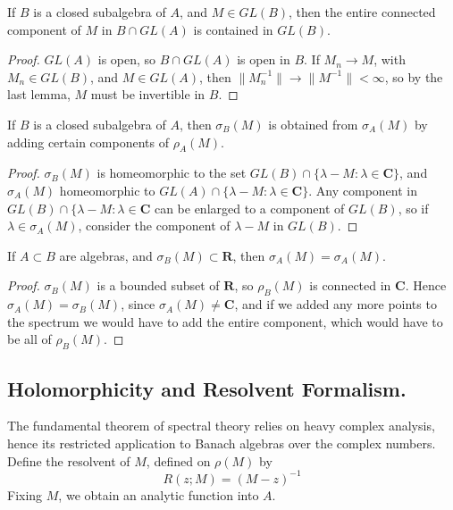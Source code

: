 \begin{theorem}
    If $B$ is a closed subalgebra of $A$, and $M \in GL(B)$, then the entire connected component of $M$ in $B \cap GL(A)$ is contained in $GL(B)$.
\end{theorem}
\begin{proof}
    $GL(A)$ is open, so $B \cap GL(A)$ is open in $B$. If $M_n \to M$, with $M_n \in GL(B)$, and $M \in GL(A)$, then $\| M_n^{-1} \| \to \| M^{-1} \| < \infty$, so by the last lemma, $M$ must be invertible in $B$.
\end{proof}

\begin{corollary}
    If $B$ is a closed subalgebra of $A$, then $\sigma_B(M)$ is obtained from $\sigma_A(M)$ by adding certain components of $\rho_A(M)$.
\end{corollary}
\begin{proof}
    $\sigma_B(M)$ is homeomorphic to the set $GL(B) \cap \{ \lambda - M : \lambda \in \mathbf{C} \}$, and $\sigma_A(M)$ homeomorphic to $GL(A) \cap \{ \lambda - M : \lambda \in \mathbf{C} \}$. Any component in $GL(B) \cap \{ \lambda - M : \lambda \in \mathbf{C}$ can be enlarged to a component of $GL(B)$, so if $\lambda \in \sigma_A(M)$, consider the component of $\lambda - M$ in $GL(B)$.
\end{proof}

\begin{corollary}
    If $A \subset B$ are algebras, and $\sigma_B(M) \subset \mathbf{R}$, then $\sigma_A(M) = \sigma_A(M)$.
\end{corollary}
\begin{proof}
    $\sigma_B(M)$ is a bounded subset of $\mathbf{R}$, so $\rho_B(M)$ is connected in $\mathbf{C}$. Hence $\sigma_A(M) = \sigma_B(M)$, since $\sigma_A(M) \neq \mathbf{C}$, and if we added any more points to the spectrum we would have to add the entire component, which would have to be all of $\rho_B(M)$.
\end{proof}

\subsection{Holomorphicity and Resolvent Formalism.}

The fundamental theorem of spectral theory relies on heavy complex analysis, hence its restricted application to Banach algebras over the complex numbers. Define the resolvent of $M$, defined on $\rho(M)$ by
%
\[ R(z; M) = (M - z)^{-1} \]
%
Fixing $M$, we obtain an analytic function into $A$.

